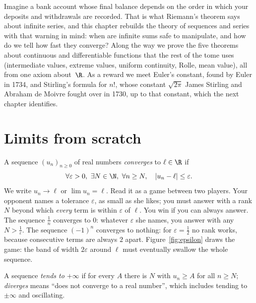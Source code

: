 Imagine a bank account whose final balance depends on the order in which your deposits and withdrawals are recorded. That is what Riemann's theorem
says about infinite series, and this chapter rebuilds the theory of sequences and series with that warning in mind: when are infinite sums safe to
manipulate, and how do we tell how fast they converge? Along the way we prove the five theorems about continuous and differentiable functions that
the rest of the tome uses (intermediate values, extreme values, uniform continuity, Rolle, mean value), all from one axiom about~$\R$. As a reward we
meet Euler's constant, found by Euler in 1734, and Stirling's formula for $n!$, whose constant $\sqrt{2\pi}$ James Stirling and Abraham de Moivre
fought over in 1730, up to that constant, which the next chapter identifies.


\section{Limits from scratch}

\begin{reminder}
A sequence $(u_n)_{n\ge0}$ of real numbers \emph{converges} to $\ell\in\R$ if
\[
\forall\varepsilon>0,\ \exists N\in\N,\ \forall n\ge N,\quad|u_n-\ell|\le\varepsilon.
\]
We write $u_n\to\ell$ or $\lim u_n=\ell$. Read it as a game between two players. Your opponent names a tolerance $\varepsilon$, as small as she
likes; you must answer with a rank $N$ beyond which \emph{every} term is within $\varepsilon$ of $\ell$. You win if you can always answer. The
sequence $\frac1n$ converges to $0$: whatever $\varepsilon$ she names, you answer with any $N>\frac1\varepsilon$. The sequence $(-1)^n$ converges to
nothing: for $\varepsilon=\frac12$ no rank works, because consecutive terms are always $2$ apart.
Figure~\ref{fig:epsilon} draws the game: the band of width $2\varepsilon$ around $\ell$ must eventually swallow the whole sequence.

A sequence \emph{tends to $+\infty$} if for every $A$ there is $N$ with $u_n\ge A$ for all $n\ge N$; \emph{diverges} means ``does not converge to a real
number'', which includes tending to $\pm\infty$ and oscillating.
\end{reminder}

